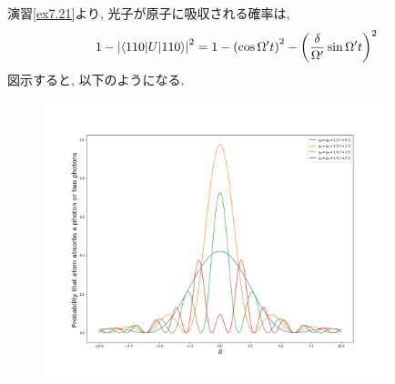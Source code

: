 \begin{ex}
    \label{ex7.22}
    演習\ref{ex7.21}より, 光子が原子に吸収される確率は,
    \begin{align*}
        1 - \left| \braket{110|U|110}\right|^2
        =  1 - \left(\cos\Omega' t\right)^2 - \left(\frac{\delta}{\Omega'} \sin\Omega't \right)^2
    \end{align*}
    図示すると, 以下のようになる.
    \begin{figure}[H]
        \begin{center}
            \includegraphics[width = 100mm]{../fig/ex7_22.png}
        \end{center}
    \end{figure}
\end{ex}

\begin{ex}
    \label{ex7.23}
\end{ex}